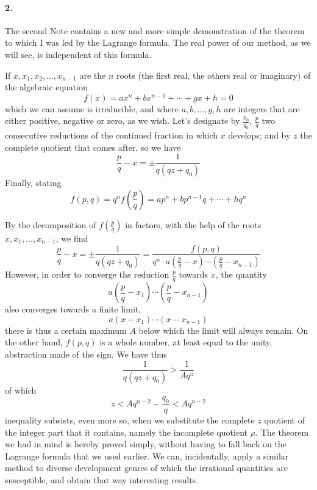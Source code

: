 \documentclass{article}
\begin{document}
\paragraph{2.}
The second Note contains a new and more simple demonstration of the theorem to
which I was led by the Lagrange formula. The real power of our method, as we
will see, is independent of this formula.
\begin{displayquote}
	If $x, x_1, x_2, \ldots, x_{n-1}$ are the $n$ roots (the first real, the others real or
	imaginary) of the algebraic equation
	$$f(x) = ax^n + bx^{n-1} + \cdots + gx + h = 0$$
	which we can assume is irreducible, and where $a, b, \ldots, g, h$ are
	integers that are either positive, negative or zero, as we wish. Let’s
	designate by $\frac{p_0}{q_0}$, $\frac{p}{q}$ two consecutive reductions of
	the continued fraction in which $x$ develops; and by $z$ the complete quotient
	that comes after, so we have
	$$\frac{p}{q} - x = \pm\frac{1}{q(qz + q_0)}$$
	Finally, stating
	$$f(p,q) = q^n f(\frac{p}{q}) = ap^n + bp^{n-1}q + \cdots + hq^n$$

	By the decomposition of $f(\frac{p}{q})$ in factors, with the help of the
	roots $x, x_1, \ldots, x_{n-1}$, we find
	$$\frac{p}{q} - x = \pm\frac{1}{q(qz+q_0)}
		= \frac{f(p,q)}{q^n\cdot a\left(\frac{p}{q}
			- x\right)\cdots\left(\frac{p}{q}-x_{n-1}\right)}$$
	However, in order to converge the reduction $\frac{p}{q}$ towards $x$, the
	quantity
	$$a\left(\frac{p}{q} - x_1\right)\cdots\left(\frac{p}{q} - x_{n-1}\right)$$
	also converges towards a finite limit,
	$$a(x-x_1)\cdots(x-x_{n-1})$$
	there is thus a certain maximum $A$ below which the limit will always remain.
	On the other hand, $f(p,q)$ is a whole number, at least equal to the unity,
	abstraction made of the sign. We have thus
	$$\frac{1}{q(qz+q_0)} > \frac{1}{Aq^n}$$
	of which
	$$z < Aq^{n-2} - \frac{q_0}{q} < Aq^{n-2}$$
	inequality subsists, even more so, when we substitute the complete $z$
	quotient of the integer part that it contains, namely the incomplete quotient
	$\mu$. The theorem we had in mind is hereby proved simply, without having to
	fall back on the Lagrange formula that we used earlier. We can, incidentally,
	apply a similar method to diverse development genres of which the irrational
	quantities are susceptible, and obtain that way interesting results.
\end{displayquote}
\end{document}
